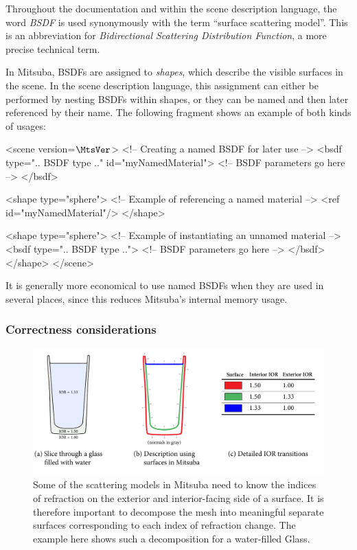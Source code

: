 Throughout the documentation and within the scene description
language,  the word \emph{BSDF} is used synonymously with the term ``surface
scattering model''. This is an abbreviation for \emph{Bidirectional
Scattering Distribution Function}, a more precise technical
term.

In Mitsuba, BSDFs are
assigned to \emph{shapes}, which describe the visible surfaces in
the scene. In the scene description language, this assignment can
either be performed by nesting BSDFs within shapes, or they can
be named and then later referenced by their name.
The following fragment shows an example of both kinds of usages:
\begin{xml}
<scene version=$\MtsVer$>
	<!-- Creating a named BSDF for later use -->
	<bsdf type=".. BSDF type .." id="myNamedMaterial">
		<!-- BSDF parameters go here -->
	</bsdf>

	<shape type="sphere">
		<!-- Example of referencing a named material -->
		<ref id="myNamedMaterial"/>
	</shape>

	<shape type="sphere">
		<!-- Example of instantiating an unnamed material -->
		<bsdf type=".. BSDF type ..">
			<!-- BSDF parameters go here -->
		</bsdf>
	</shape>
</scene>
\end{xml}
It is generally more economical to use named BSDFs when they
are used in several places, since this reduces Mitsuba's internal
memory usage.
\subsubsection*{Correctness considerations}
\begin{figure}[b!]
\centering
\vspace{-5mm}
\includegraphics[width=15cm]{images/glass_explanation.pdf}
\vspace{-5mm}
\caption{
	\label{fig:glass-explanation}
	Some of the scattering models in Mitsuba need to know
	the indices of refraction on the exterior and interior-facing
	side of a surface.
	It is therefore important to decompose the mesh into meaningful
	separate surfaces corresponding to each index of refraction change.
	The example here shows such a decomposition for a water-filled Glass.
}
\end{figure}

